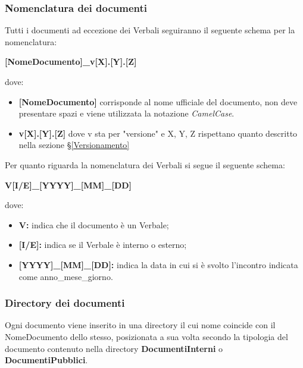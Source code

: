 \subsubsection{Nomenclatura dei documenti} \label{NomenclaturaDoc}
Tutti i documenti ad eccezione dei Verbali seguiranno il seguente schema per la nomenclatura:

\begin{center}
	\textbf{[NomeDocumento]\_v[X].[Y].[Z]}
\end{center}
dove:
\begin{itemize}
	\item \textbf{[NomeDocumento]} corrisponde al nome ufficiale del documento, non deve presentare spazi e viene utilizzata la notazione \textit{CamelCase}.
	\item \textbf{v[X].[Y].[Z]} dove v sta per "versione" e X, Y, Z rispettano quanto descritto nella sezione \S\ref{Versionamento}
\end{itemize}

Per quanto riguarda la nomenclatura dei Verbali si segue il seguente schema:
\begin{center}
	\textbf{V[I/E]\_[YYYY]\_[MM]\_[DD]}
\end{center}
dove:
\begin{itemize}
	\item \textbf{V: } indica che il documento è un Verbale;
	\item \textbf{[I/E]: } indica se il Verbale è interno o esterno;
	\item \textbf{[YYYY]\_[MM]\_[DD]: } indica la data in cui si è svolto l'incontro indicata come anno\_mese\_giorno.
\end{itemize}

\subsubsection{Directory dei documenti}
Ogni documento viene inserito in una directory il cui nome coincide con il NomeDocumento dello stesso, posizionata a sua volta secondo la tipologia del documento contenuto nella directory \textbf{DocumentiInterni} o \textbf{DocumentiPubblici}.


